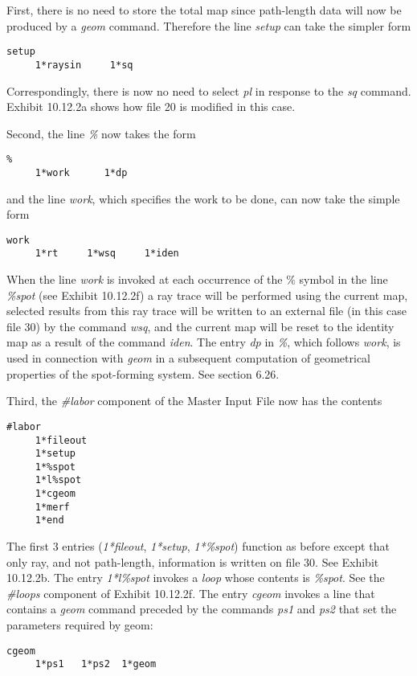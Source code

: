 First, there is no need to store the total map since path-length data
will now be produced by a {\em geom} command.  Therefore the line {\em
setup} can take the simpler form
\begin{footnotesize}
\begin{verbatim}
setup
     1*raysin     1*sq
\end{verbatim}
\end{footnotesize}
Correspondingly, there is now no need to select {\em pl} in response to
the {\em sq} command.  Exhibit 10.12.2a shows
how file 20 is modified in this case.

Second, the line {\em \%} now takes the form
\begin{footnotesize}
\begin{verbatim}
%
     1*work      1*dp
\end{verbatim}
\end{footnotesize}
and the line {\em work}, which specifies the work to be done, can now take the
simple form
\begin{footnotesize}
\begin{verbatim}
work
     1*rt     1*wsq     1*iden
\end{verbatim}
\end{footnotesize}
When the line {\em work} is invoked at each occurrence of the $\%$ symbol
in the line {\em \%spot} (see Exhibit 10.12.2f) a ray trace will be
performed using the current map, selected results from this ray trace
will be written to an external file (in this case file 30) by the command
{\em wsq}, and the current map will be reset to the identity map as a
result of the command {\em iden}.  The entry {\em dp} in {\em \%}, which follows {\em
work}, is used in connection with {\em geom} in a subsequent computation of geometrical properties of
the spot-forming system.  See section 6.26.

Third, the {\em \#labor} component of the Master Input File now has the
contents
\begin{footnotesize}
\begin{verbatim}
#labor
	 1*fileout
	 1*setup
	 1*%spot
	 1*l%spot
	 1*cgeom
	 1*merf
	 1*end
\end{verbatim}
\end{footnotesize}

The first 3 entries ({\em 1*fileout}, {\em 1*setup}, {\em 1*\%spot})
function as before except that only ray, and not path-length, information
is written on file 30.  See Exhibit 10.12.2b.  The entry {\em 1*l\%spot}
invokes a {\em loop} whose contents is {\em \%spot}.  See the {\em \#loops}
component of Exhibit 10.12.2f.  The entry {\em cgeom} invokes a line that
contains a {\em geom} command preceded by the commands {\em ps1}
and {\em ps2} that set the parameters required by geom:
\begin{footnotesize}
\begin{verbatim}
cgeom
     1*ps1   1*ps2  1*geom
\end{verbatim}
\end{footnotesize}

